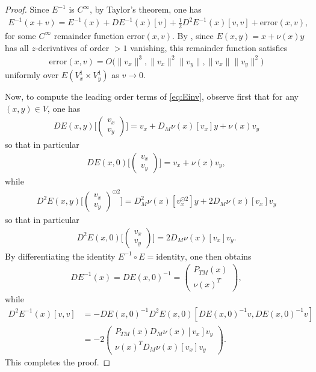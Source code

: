 \documentclass{article}
\theoremstyle{plain}
\theoremstyle{definition}
\theoremstyle{remark}
\begin{document}
\begin{proof}
    Since $E^{-1}$ is $C^{\infty}$, by Taylor's theorem, one has
    \begin{align}\label{eq:Einv}
    E^{-1}(x+v) = E^{-1}(x) + DE^{-1}(x)[v] + \frac{1}{2}D^2E^{-1}(x)[v,v] + \mathrm{error}(x,v),
    \end{align}
    for some $C^{\infty}$ remainder function $\mathrm{error}(x,v)$. By \cite[Lemma C.3]{macdonaldeos}, since $E(x,y) = x + \nu(x)y$ has all $z$-derivatives of order $>1$ vanishing, this remainder function satisfies
    \begin{align}
    \mathrm{error}(x,v) = O\big(\|v_x\|^3,\|v_x\|^2\|v_y\|,\|v_x\|\|v_y\|^2\big)
    \end{align}
    uniformly over $E(V^1_x\times V^1_y)$ as $v\rightarrow 0$.
    
    Now, to compute the leading order terms of \eqref{eq:Einv}, observe first that for any $(x,y)\in V$, one has
    \begin{align}
    DE(x,y)\bigg[\begin{pmatrix} v_x\\v_y\end{pmatrix}\bigg] = v_x+ D_M\nu(x)[v_x]y + \nu(x)v_y
    \end{align}
    so that in particular
    \begin{align}
    DE(x,0)\bigg[\begin{pmatrix} v_x \\ v_y\end{pmatrix}\bigg] = v_x + \nu(x)v_y,
    \end{align}
    while
    \begin{align}
        D^2E(x,y)\bigg[\begin{pmatrix} v_x\\v_y\end{pmatrix}^{\odot 2}\bigg] = D^2_M\nu(x)[v_x^{\odot 2}]y + 2D_M\nu(x)[v_x]v_y
    \end{align}
    so that in particular
    \begin{align}
    D^2E(x,0)\bigg[\begin{pmatrix} v_x\\v_y\end{pmatrix}\bigg] = 2D_M\nu(x)[v_x]v_y.
    \end{align}
    By differentiating the identity $E^{-1}\circ E = \mathrm{identity}$, one then obtains
    \begin{align}
    DE^{-1}(x) = DE(x,0)^{-1} = \begin{pmatrix} P_{TM}(x)\\\nu(x)^T\end{pmatrix},
    \end{align}
    while
    \begin{align}
    D^2E^{-1}(x)[v,v] &= -DE(x,0)^{-1}D^2E(x,0)[DE(x,0)^{-1}v,DE(x,0)^{-1}v]\\&=-2\begin{pmatrix} P_{TM}(x)D_M\nu(x)[v_x]v_y \\ \nu(x)^TD_M\nu(x)[v_x]v_y\end{pmatrix}.
    \end{align}
    This completes the proof. 
\end{proof}
\end{document}
